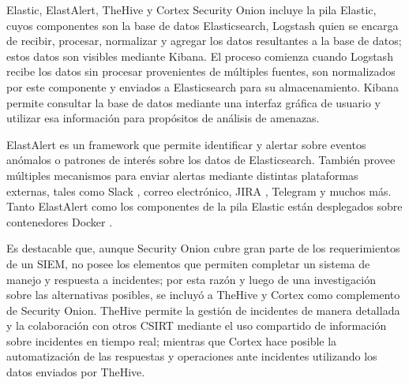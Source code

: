    \begin{section}{Elastic, ElastAlert, TheHive y Cortex}
        Security Onion incluye la pila Elastic, cuyos componentes son la base de datos Elasticsearch, Logstash quien se encarga de recibir, procesar, normalizar y agregar los datos resultantes a la base de datos; estos datos son visibles mediante Kibana. El proceso comienza cuando Logstash recibe los datos sin procesar provenientes de múltiples fuentes, son normalizados por este componente y enviados a Elasticsearch para su almacenamiento. Kibana permite consultar la base de datos mediante una interfaz gráfica de usuario y utilizar esa información para propósitos de análisis de amenazas. \par
        ElastAlert es un framework que permite identificar y alertar sobre eventos anómalos o patrones de interés sobre los datos de Elasticsearch. También provee múltiples mecanismos para enviar alertas mediante distintas plataformas externas, tales como Slack \cite{slack}, correo electrónico, JIRA \cite{jira}, Telegram \cite{telegram} y muchos más. Tanto ElastAlert como los componentes de la pila Elastic están desplegados sobre contenedores Docker \cite{docker}. \par
        Es destacable que, aunque Security Onion cubre gran parte de los requerimientos de un SIEM, no posee los elementos que permiten completar un sistema de manejo y respuesta a incidentes; por esta razón y luego de una investigación sobre las alternativas posibles, se incluyó a TheHive \cite{thehive} y Cortex \cite{thehive} como complemento de Security Onion. TheHive permite la gestión de incidentes de manera detallada y la colaboración con otros CSIRT mediante el uso compartido de información sobre incidentes en tiempo real; mientras que Cortex hace posible la automatización de las respuestas y operaciones ante incidentes utilizando los datos enviados por TheHive. \par

   \end{section}
